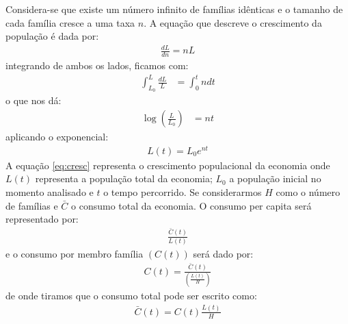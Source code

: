 \documentclass[11pt,a4paper]{article}
\begin{document}
Considera-se que existe um número infinito de famílias idênticas e o tamanho de cada família cresce a uma taxa $n$. A equação que descreve o crescimento da população é dada por:
\begin{align*}
\frac{dL}{dn} = nL
\end{align*}
\noindent
integrando de ambos os lados, ficamos com:
\begin{align*}
\int_{L_0}^{L}\frac{dL}{L} &= \int_0 ^t ndt 
\end{align*}
\noindent
o que nos dá:
\begin{align*}
\log \left(\frac{L}{L_0}\right) &= nt 
\end{align*}
\noindent
aplicando o exponencial:
\begin{align} \label{eq:cresc}
L(t) = L_0 e^{nt}
\end{align}
A equação \eqref{eq:cresc} representa o crescimento populacional da economia onde $L(t)$ representa a população total da economia; $L_0$ a população inicial no momento analisado e $t$ o tempo percorrido. Se considerarmos $H$ como o número de famílias e $\bar{C}$ o consumo total da economia. O consumo per capita será representado por:
\begin{align*}
\frac{\bar{C}(t)}{L(t)}
\end{align*} 
\noindent
e o consumo por membro família $(C(t))$ será dado por:
\begin{align} \label{eq:fam}
C(t) = \frac{\bar{C}(t)}{\left(\frac{L(t)}{H}\right)}
\end{align}
\noindent
de onde tiramos que o consumo total pode ser escrito como:
\begin{align*}
\bar{C}(t) = C(t)\frac{L(t)}{H}
\end{align*}
\end{document}

